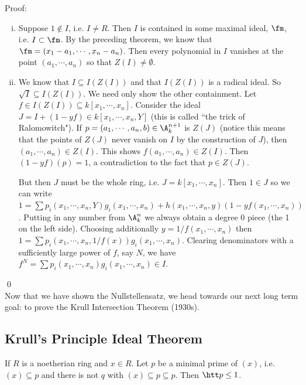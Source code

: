 \noindent Proof: 
\begin{enumerate}[(i)]
\item Suppose $1 \notin I$, i.e. $I \neq R$. Then $I$ is contained in some maximal ideal, $\fm$, i.e. $I \subset \fm$. By the preceding theorem, we know that $\fm=(x_1-a_1,\cdots,x_n-a_n)$. Then every polynomial in $I$ vanishes at the point $(a_1,\cdots,a_n)$ so that $Z(I) \neq \emptyset$. 

\item We know that $I \subseteq I(Z(I))$ and that $I(Z(I))$ is a radical ideal. So $\sqrt{I} \subseteq I(Z(I))$. We need only show the other containment. Let $f \in I(Z(I)) \subseteq k[x_1,\cdots,x_n]$. Consider the ideal $J=I+(1-yf) \in k[x_1,\cdots,x_n,Y]$ (this is called ``the trick of Ralomowitch"). If $p=(a_1,\cdots,a_n,b) \in \A_k^{n+1}$ is $Z(J)$ (notice this means that the points of $Z(J)$ never vanish on $I$ by the construction of $J$), then $(a_1,\cdots,a_n) \in Z(I)$. This shows $f(a_1,\cdots,a_n) \in Z(I)$. Then $(1-yf)(p)=1$, a contradiction to the fact that $p \in Z(J)$.

But then $J$ must be the whole ring, i.e. $J=k[x_1,\cdots,x_n]$. Then $1 \in J$ so we can write $1=\sum p_i(x_1,\cdots,x_n,Y)g_i(x_1,\cdots,x_n)+h(x_1,\cdots,x_n,y)(1-yf(x_1,\cdots,x_n))$. Putting in any number from $\A_k^n$ we always obtain a degree 0 piece (the 1 on the left side). Choosing additionally $y=1/f(x_1,\cdots,x_n)$ then $1=\sum p_i(x_1,\cdots,x_n,1/f(x))g_i(x_1,\cdots,x_n)$. Clearing denominators with a sufficiently large power of $f$, say $N$, we have $f^N=\sum p_i(x_1,\cdots,x_n)g_i(x_1,\cdots,x_n) \in I$.

\end{enumerate}
\qed \\

Now that we have shown the Nullstellensatz, we head towards our next long term goal: to prove the Krull Intersection Theorem (1930s). 

\subsection{Krull's Principle Ideal Theorem}

\begin{lem}
If $R$ is a noetherian ring and $x \in R$. Let $p$ be a minimal prime of $(x)$, i.e. $(x) \subseteq p$ and there is not $q$ with $(x) \subseteq p \subseteq p$. Then $\htt p \leq 1$. 
\end{lem}

